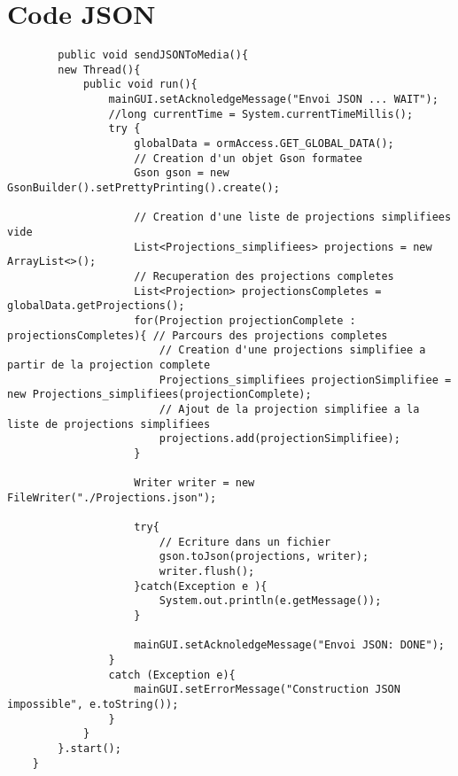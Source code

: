 \documentclass[a4paper]{article} %
\begin{document}
\section{Code JSON}
\begin{lstlisting}
		public void sendJSONToMedia(){
		new Thread(){
			public void run(){
				mainGUI.setAcknoledgeMessage("Envoi JSON ... WAIT");
				//long currentTime = System.currentTimeMillis();
				try {
					globalData = ormAccess.GET_GLOBAL_DATA();
					// Creation d'un objet Gson formatee
					Gson gson = new GsonBuilder().setPrettyPrinting().create();

					// Creation d'une liste de projections simplifiees vide
					List<Projections_simplifiees> projections = new ArrayList<>();
					// Recuperation des projections completes
					List<Projection> projectionsCompletes = globalData.getProjections();
					for(Projection projectionComplete : projectionsCompletes){ // Parcours des projections completes
						// Creation d'une projections simplifiee a partir de la projection complete
						Projections_simplifiees projectionSimplifiee = new Projections_simplifiees(projectionComplete);
						// Ajout de la projection simplifiee a la liste de projections simplifiees
						projections.add(projectionSimplifiee);
					}

					Writer writer = new FileWriter("./Projections.json");

					try{
						// Ecriture dans un fichier
						gson.toJson(projections, writer);
						writer.flush();
					}catch(Exception e ){
						System.out.println(e.getMessage());
					}

					mainGUI.setAcknoledgeMessage("Envoi JSON: DONE");
				}
				catch (Exception e){
					mainGUI.setErrorMessage("Construction JSON impossible", e.toString());
				}
			}
		}.start();
	}

\end{lstlisting}
\end{document}
